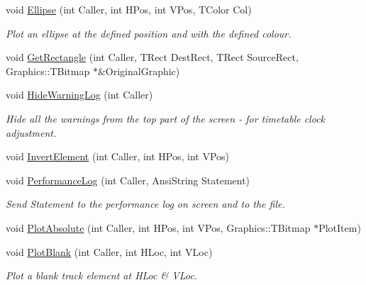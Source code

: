 \begin{DoxyCompactItemize}
\mbox{\label{class_t_display_ac97de4f74b0b295de941320578d6da28}} 
void \mbox{\hyperlink{class_t_display_ac97de4f74b0b295de941320578d6da28}{Ellipse}} (int Caller, int H\+Pos, int V\+Pos, T\+Color Col)
\begin{DoxyCompactList}\small\item\em Plot an ellipse at the defined position and with the defined colour. \end{DoxyCompactList}\item 
void \mbox{\hyperlink{class_t_display_a2b408bc588565f7b0cdcb85edc7479b7}{Get\+Rectangle}} (int Caller, T\+Rect Dest\+Rect, T\+Rect Source\+Rect, Graphics\+::\+T\+Bitmap $\ast$\&Original\+Graphic)
\item 
\mbox{\label{class_t_display_ab77f8f220d8c0f3fbdcc96a616b969e6}} 
void \mbox{\hyperlink{class_t_display_ab77f8f220d8c0f3fbdcc96a616b969e6}{Hide\+Warning\+Log}} (int Caller)
\begin{DoxyCompactList}\small\item\em Hide all the warnings from the top part of the screen -\/ for timetable clock adjustment. \end{DoxyCompactList}\item 
void \mbox{\hyperlink{class_t_display_a63930b93b9883463cd9d779e86fefba2}{Invert\+Element}} (int Caller, int H\+Pos, int V\+Pos)
\item 
\mbox{\label{class_t_display_a92bea1eb27a17c6c7f902858d4115d71}} 
void \mbox{\hyperlink{class_t_display_a92bea1eb27a17c6c7f902858d4115d71}{Performance\+Log}} (int Caller, Ansi\+String Statement)
\begin{DoxyCompactList}\small\item\em Send Statement to the performance log on screen and to the file. \end{DoxyCompactList}\item 
void \mbox{\hyperlink{class_t_display_a7dae1c6470743a7cb778a6f813c7f0cc}{Plot\+Absolute}} (int Caller, int H\+Pos, int V\+Pos, Graphics\+::\+T\+Bitmap $\ast$Plot\+Item)
\item 
\mbox{\label{class_t_display_ad601661fd4cd79a47b4c80ae77f901a9}} 
void \mbox{\hyperlink{class_t_display_ad601661fd4cd79a47b4c80ae77f901a9}{Plot\+Blank}} (int Caller, int H\+Loc, int V\+Loc)
\begin{DoxyCompactList}\small\item\em Plot a blank track element at H\+Loc \& V\+Loc. \end{DoxyCompactList}\item 

\end{DoxyCompactItemize}
